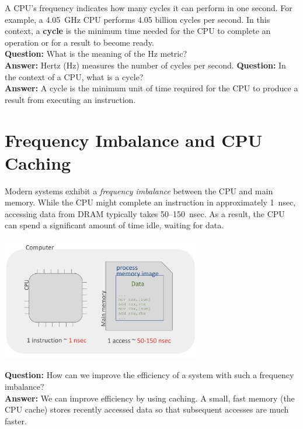 \begin{definition}
A CPU’s frequency indicates how many cycles it can perform in one second. For example, a 4.05~GHz CPU performs 4.05 billion cycles per second. In this context, a \textbf{cycle} is the minimum time needed for the CPU to complete an operation or for a result to become ready.\\
\vspace{0.5em}
{\textbf{Question:} What is the meaning of the Hz metric?}\\[0.5em]
\textbf{Answer:} Hertz (Hz) measures the number of cycles per second.
\vspace{0.5em}
{\textbf{Question:} In the context of a CPU, what is a cycle?}\\[0.5em]
\textbf{Answer:} A cycle is the minimum unit of time required for the CPU to produce a result from executing an instruction.
\end{definition}


\section{Frequency Imbalance and CPU Caching}

Modern systems exhibit a \emph{frequency imbalance} between the CPU and main memory. While the CPU might complete an instruction in approximately 1~nsec, accessing data from DRAM typically takes 50–150~nsec. As a result, the CPU can spend a significant amount of time idle, waiting for data.

\begin{center}
  \includegraphics[width=0.65\textwidth]{chapters/L1/images/imbalance.png}
\end{center}

\vspace{0.5em}
{\textbf{Question:} How can we improve the efficiency of a system with such a frequency imbalance?}\\[0.5em]
\textbf{Answer:} We can improve efficiency by using caching. A small, fast memory (the CPU cache) stores recently accessed data so that subsequent accesses are much faster.
\newpage
